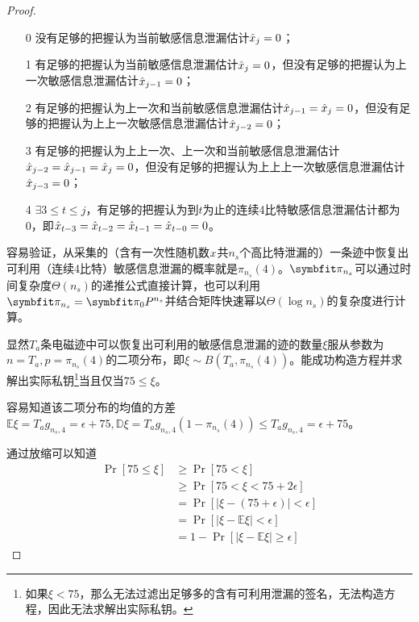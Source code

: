 {\begin{proof}
	\begin{enumerate}
		\item [0] 没有足够的把握认为当前敏感信息泄漏估计$\hat{x}_j=0$；
		\item [1] 有足够的把握认为当前敏感信息泄漏估计$\hat{x}_j=0$，但没有足够的把握认为上一次敏感信息泄漏估计$\hat{x}_{j-1}=0$；
		\item [2] 有足够的把握认为上一次和当前敏感信息泄漏估计$\hat{x}_{j-1}=\hat{x}_j=0$，但没有足够的把握认为上上一次敏感信息泄漏估计$\hat{x}_{j-2}=0$；
		\item [3] 有足够的把握认为上上一次、上一次和当前敏感信息泄漏估计$\hat{x}_{j-2}=\hat{x}_{j-1}=\hat{x}_j=0$，但没有足够的把握认为上上上一次敏感信息泄漏估计$\hat{x}_{j-3}=0$；
		\item [4] $\exists 3\le t\le j$，有足够的把握认为到$t$为止的连续4比特敏感信息泄漏估计都为0，即$\hat{x}_{t-3}=\hat{x}_{t-2}=\hat{x}_{t-1}=\hat{x}_{t-0}=0$。
	\end{enumerate}

	容易验证，从采集的（含有一次性随机数$x$共$n_s$个高比特泄漏的）一条迹中恢复出可利用（连续4比特）敏感信息泄漏的概率就是$\pi_{n_s}(4)$。$\Vector \pi_{n_s}$可以通过时间复杂度$\Theta(n_s)$的递推公式直接计算，也可以利用$\Vector \pi_{n_s}=\Vector \pi_0 P^{n_s}$并结合矩阵快速幂以$\Theta(\log n_s)$的复杂度进行计算。
		
	
	显然$T_a$条电磁迹中可以恢复出可利用的敏感信息泄漏的迹的数量$\xi$服从参数为$n=T_a,p=\pi_{n_s}(4)$的二项分布，即$\xi\sim B(T_a,\pi_{n_s}(4))$。能成功构造方程并求解出实际私钥\footnote{如果$\xi<75$，那么无法过滤出足够多的含有可利用泄漏的签名，无法构造方程，因此无法求解出实际私钥。}当且仅当$75\le\xi$。
	
	容易知道该二项分布的均值的方差$\mathbb E\xi=T_ag_{n_s,4}=\epsilon+75,\mathbb D\xi=T_ag_{n_s,4}(1-\pi_{n_s}(4))\le T_ag_{n_s,4}=\epsilon+75$。
	
	通过放缩可以知道\begin{align*}
		\Pr\left[75\le\xi\right]&\ge\Pr\left[75<\xi\right]\\
		&\ge\Pr\left[75<\xi<75+2\epsilon\right]\\
		&=\Pr\left[\vert \xi-(75+\epsilon)\vert<\epsilon\right]\\
		&=\Pr\left[\vert \xi-\mathbb E\xi\vert<\epsilon\right]\\
		&=1-\Pr\left[\vert \xi-\mathbb E\xi\vert\ge\epsilon\right]
	\end{align*}
	

\end{proof}}
